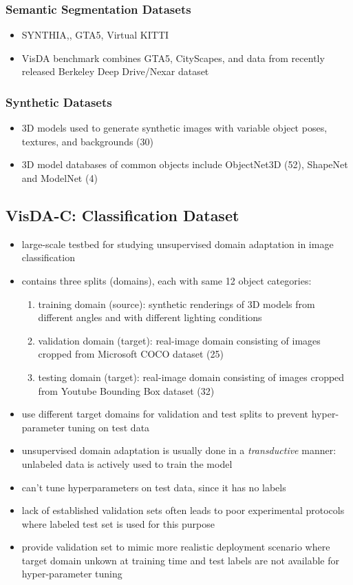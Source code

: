\subsubsection{Semantic Segmentation Datasets}
\begin{itemize}
	\item SYNTHIA,, GTA5, Virtual KITTI
	\item VisDA benchmark combines GTA5, CityScapes, and data from recently released Berkeley Deep Drive/Nexar dataset
\end{itemize}

\subsubsection{Synthetic Datasets}
\begin{itemize}
	\item 3D models used to generate synthetic images with variable object poses, textures, and backgrounds (30)
	\item 3D model databases of common objects include ObjectNet3D (52), ShapeNet and ModelNet (4)
\end{itemize}

\subsection{VisDA-C: Classification Dataset}
\begin{itemize}
	\item large-scale testbed for studying unsupervised domain adaptation in image classification 
	\item contains three splits (domains), each with same 12 object categories:
	\begin{enumerate}
		\item training domain (source): synthetic renderings of 3D models from different angles and with different lighting conditions
		\item validation domain (target): real-image domain consisting of images cropped from Microsoft COCO dataset (25)
		\item testing domain (target): real-image domain consisting of images cropped from Youtube Bounding Box dataset (32)
	\end{enumerate}
	\item use different target domains for validation and test splits to prevent hyper-parameter tuning on test data
	\item unsupervised domain adaptation is usually done in a \textit{transductive} manner: unlabeled data is actively used to train the model
	\item can't tune hyperparameters on test data, since it has no labels
	\item lack of established validation sets often leads to poor experimental protocols where labeled test set is used for this purpose
	\item provide validation set to mimic more realistic deployment scenario where target domain unkown at training time and test labels are not available for hyper-parameter tuning
\end{itemize}


